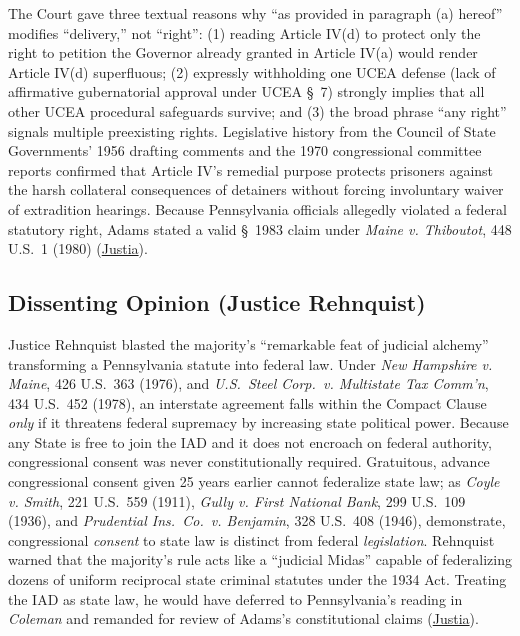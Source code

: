 \documentclass[12pt]{article}
\begin{document}
The Court gave three textual reasons why ``as provided in paragraph (a) hereof'' modifies ``delivery,'' not ``right'': (1) reading Article IV(d) to protect only the right to petition the Governor already granted in Article IV(a) would render Article IV(d) superfluous; (2) expressly withholding one UCEA defense (lack of affirmative gubernatorial approval under UCEA \S\ 7) strongly implies that all other UCEA procedural safeguards survive; and (3) the broad phrase ``any right'' signals multiple preexisting rights. Legislative history from the Council of State Governments' 1956 drafting comments and the 1970 congressional committee reports confirmed that Article IV's remedial purpose protects prisoners against the harsh collateral consequences of detainers without forcing involuntary waiver of extradition hearings. Because Pennsylvania officials allegedly violated a federal statutory right, Adams stated a valid \S\ 1983 claim under \textit{Maine v. Thiboutot}, 448 U.S.\ 1 (1980) (\href{https://supreme.justia.com/cases/federal/us/449/433/}{Justia}).

\subsection{Dissenting Opinion (Justice Rehnquist)}

Justice Rehnquist blasted the majority's ``remarkable feat of judicial alchemy'' transforming a Pennsylvania statute into federal law. Under \textit{New Hampshire v. Maine}, 426 U.S.\ 363 (1976), and \textit{U.S.\ Steel Corp.\ v. Multistate Tax Comm'n}, 434 U.S.\ 452 (1978), an interstate agreement falls within the Compact Clause \textit{only} if it threatens federal supremacy by increasing state political power. Because any State is free to join the IAD and it does not encroach on federal authority, congressional consent was never constitutionally required. Gratuitous, advance congressional consent given 25 years earlier cannot federalize state law; as \textit{Coyle v. Smith}, 221 U.S.\ 559 (1911), \textit{Gully v. First National Bank}, 299 U.S.\ 109 (1936), and \textit{Prudential Ins.\ Co.\ v. Benjamin}, 328 U.S.\ 408 (1946), demonstrate, congressional \textit{consent} to state law is distinct from federal \textit{legislation}. Rehnquist warned that the majority's rule acts like a ``judicial Midas'' capable of federalizing dozens of uniform reciprocal state criminal statutes under the 1934 Act. Treating the IAD as state law, he would have deferred to Pennsylvania's reading in \textit{Coleman} and remanded for review of Adams's constitutional claims (\href{https://supreme.justia.com/cases/federal/us/449/433/}{Justia}).
\end{document}

